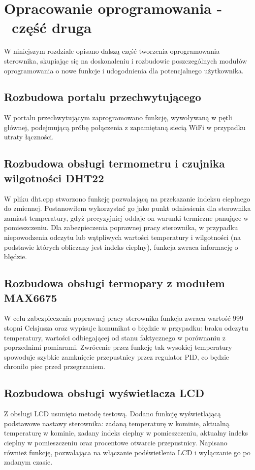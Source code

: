 \documentclass[11pt]{report}
\begin{document}
 \chapter{Opracowanie oprogramowania -~część druga}\label{ch:oprog:2}
 W niniejszym rozdziale opisano dalszą część tworzenia oprogramowania sterownika, skupiając się na doskonaleniu i rozbudowie poszczególnych modułów oprogramowania o nowe funkcje i udogodnienia dla potencjalnego użytkownika.

  \section{Rozbudowa portalu przechwytującego}
  W portalu przechwytującym zaprogramowano funkcję, wywoływaną w pętli głównej, podejmującą próbę połączenia z zapamiętaną siecią WiFi w przypadku utraty łączności.
  
 \section{Rozbudowa obsługi termometru i czujnika wilgotności DHT22}
W pliku dht.cpp stworzono funkcję pozwalającą na przekazanie indeksu cieplnego do zmiennej. Postanowiłem wykorzystać go jako punkt odniesienia dla sterownika zamiast temperatury, gdyż precyzyjniej oddaje on warunki termiczne panujące w pomieszczeniu. Dla zabezpieczenia poprawnej pracy sterownika, w przypadku niepowodzenia odczytu lub wątpliwych wartości temperatury i wilgotności (na podstawie których obliczany jest indeks cieplny), funkcja zwraca informację o błędzie.

 \section{Rozbudowa obsługi termopary z modułem MAX6675}
 W celu zabezpieczenia poprawnej pracy sterownika funkcja zwraca wartość 999 stopni Celsjusza oraz wypisuje komunikat o błędzie w przypadku: braku odczytu temperatury, wartości odbiegającej od stanu faktycznego w porównaniu z poprzednimi pomiarami. Zwrócenie przez funkcję tak wysokiej temperatury spowoduje szybkie zamknięcie przepustnicy przez regulator PID, co będzie chroniło piec przed przegrzaniem.
 
 \section{Rozbudowa obsługi wyświetlacza LCD}
 Z obsługi LCD usunięto metodę testową. Dodano funkcję wyświetlającą podstawowe nastawy sterownika: zadaną temperaturę w kominie, aktualną temperaturę w kominie, zadany indeks cieplny w pomieszczeniu, aktualny indeks cieplny w pomieszczeniu oraz procentowe otwarcie przepustnicy. Napisano również funkcję, pozwalająca na włączanie podświetlenia LCD i wyłączanie go po zadanym czasie.
\end{document}
